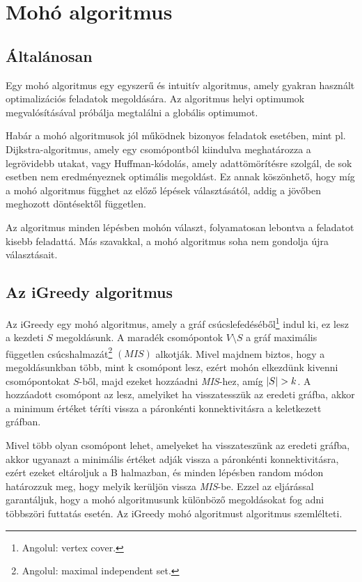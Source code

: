 \section{Mohó algoritmus}\label{sec:MOHO_ALGORITMUS}

\subsection{Általánosan}
Egy mohó algoritmus egy egyszerű és intuitív algoritmus, amely gyakran használt
optimalizációs feladatok megoldására. Az algoritmus helyi optimumok megvalósításával próbálja
megtalálni a globális optimumot.

Habár a mohó algoritmusok jól működnek bizonyos feladatok esetében,
mint pl. Dijkstra-algoritmus, amely egy csomópontból kiindulva meghatározza a legrövidebb utakat,
vagy Huffman-kódolás, amely adattömörítésre szolgál, de sok esetben nem eredményeznek optimális megoldást.
Ez annak köszönhető, hogy míg a mohó algoritmus függhet az előző lépések választásától,
addig a jövőben meghozott döntésektől független.

Az algoritmus minden lépésben mohón választ, folyamatosan lebontva a feladatot kisebb feladattá.
Más szavakkal, a mohó algoritmus soha nem gondolja újra választásait.

\subsection{Az iGreedy algoritmus}
Az iGreedy egy mohó algoritmus, amely a gráf csúcslefedéséből\footnote{ Angolul: vertex cover.} indul ki, ez lesz a kezdeti $S$ megoldásunk.
A maradék csomópontok $V \setminus S$ a gráf maximális független csúcshalmazát\footnote{ Angolul: maximal independent set.} $\left( \textit{MIS} \right)$ alkotják.
Mivel majdnem biztos, hogy a megoldásunkban több, mint k csomópont lesz, ezért mohón elkezdünk kivenni csomópontokat $S$-ből,
majd ezeket hozzáadni \emph{MIS}-hez, amíg $\lvert S\rvert > k$.
A hozzáadott csomópont az lesz, amelyiket ha visszatesszük az eredeti gráfba,
akkor a minimum értéket téríti vissza a páronkénti konnektivitásra a keletkezett gráfban.

Mivel több olyan csomópont lehet, amelyeket ha visszateszünk az eredeti gráfba,
akkor ugyanazt a minimális értéket adják vissza a páronkénti konnektivitásra,
ezért ezeket eltároljuk a B halmazban, és minden lépésben random módon határozzuk meg,
hogy melyik kerüljön vissza \emph{MIS}-be. Ezzel az eljárással garantáljuk,
hogy a mohó algoritmusunk különböző megoldásokat fog adni többszöri futtatás esetén.
Az iGreedy mohó algoritmust  algoritmus szemlélteti.

